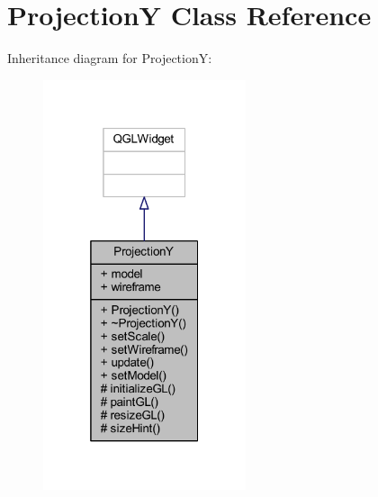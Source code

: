 \hypertarget{class_projection_y}{}\section{ProjectionY Class Reference}
\label{class_projection_y}


Inheritance diagram for ProjectionY\+:
\nopagebreak
\begin{figure}[H]
\begin{center}
\leavevmode
\includegraphics[width=169pt]{class_projection_y__inherit__graph}
\end{center}
\end{figure}


